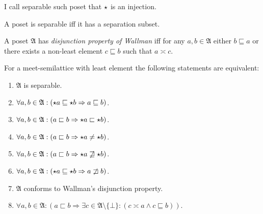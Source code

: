 \begin{defn}
I call separable such poset
that $\star$ is an injection.\end{defn}
\begin{obvious}
A poset is separable iff it has a separation subset.\end{obvious}
\begin{defn}
A poset $\mathfrak{A}$ has
\emph{disjunction property of Wallman} iff for any $a,b\in\mathfrak{A}$
either $b\sqsubseteq a$ or there exists a non-least element $c\sqsubseteq b$
such that $a\asymp c$.\end{defn}
\begin{thm}
\label{msl-sep-conds}For a meet-semilattice with least element the
following statements are equivalent:
\begin{enumerate}
\item \label{la1}$\mathfrak{A}$ is separable.
\item \label{la2}$\forall a,b\in\mathfrak{A}:(\star a\sqsubseteq\star b\Rightarrow a\sqsubseteq b)$.
\item \label{la3}$\forall a,b\in\mathfrak{A}:(a\sqsubset b\Rightarrow\star a\sqsubset\star b)$.
\item \label{la4}$\forall a,b\in\mathfrak{A}:(a\sqsubset b\Rightarrow\star a\neq\star b)$.
\item \label{la5}$\forall a,b\in\mathfrak{A}:(a\sqsubset b\Rightarrow\star a\not\sqsupseteq\star b)$.
\item \label{la6}$\forall a,b\in\mathfrak{A}:(\star a\sqsubseteq\star b\Rightarrow a\not\sqsupset b)$.
\item \label{la7}$\mathfrak{A}$ conforms to Wallman's disjunction property.
\item \label{la8}$\forall a,b\in\mathfrak{A}:(a\sqsubset b\Rightarrow\exists c\in\mathfrak{A}\setminus\{\bot\}:(c\asymp a\land c\sqsubseteq b))$.
\end{enumerate}
\end{thm}
